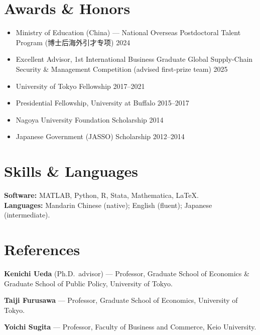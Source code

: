 \documentclass[11pt]{article}
\begin{document}
\section{Awards \& Honors}
\begin{itemize}
  \item Ministry of Education (China) --- National Overseas Postdoctoral Talent Program
        (博士后海外引才专项) \hfill 2024
  \item Excellent Advisor, 1st International Business Graduate Global Supply-Chain Security \&
        Management Competition (advised first-prize team) \hfill 2025
  \item University of Tokyo Fellowship \hfill 2017--2021
  \item Presidential Fellowship, University at Buffalo \hfill 2015--2017
  \item Nagoya University Foundation Scholarship \hfill 2014
  \item Japanese Government (JASSO) Scholarship \hfill 2012--2014
\end{itemize}

\section{Skills \& Languages}
\textbf{Software:} MATLAB, Python, R, Stata, Mathematica, \LaTeX.\\
\textbf{Languages:} Mandarin Chinese (native); English (fluent); Japanese (intermediate).

\section{References}
\textbf{Kenichi Ueda} (Ph.D.\ advisor) --- Professor, Graduate School of Economics \& Graduate School of Public Policy, University of Tokyo.\par
\textbf{Taiji Furusawa} --- Professor, Graduate School of Economics, University of Tokyo.\par
\textbf{Yoichi Sugita} --- Professor, Faculty of Business and Commerce, Keio University.\par
\end{document}
